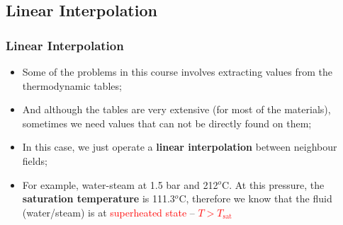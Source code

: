 \documentclass[10pt,compress,handout,ignorenonframetext]{beamer}
\begin{document}
\subsection{Linear Interpolation}
\begin{frame}
  \frametitle{Linear Interpolation}
\noindent
\begin{itemize}
\item <2-> Some of the problems in this course involves extracting values from the thermodynamic tables;
\item <3-> And although the tables are very extensive (for most of the materials), sometimes we need values that can not be directly found on them;
\item <4-> In this case, we just operate a {\bf linear interpolation} between neighbour fields;
\item <5-> For example, water-steam at 1.5 bar and 212$^{o}$C. At this pressure, the {\bf saturation temperature} is 111.3$^{o}$C, therefore we know that the fluid (water/steam) is at \textcolor{red}{superheated state} -- \textcolor{red}{$T > T_{\text{sat}}$}
\end{itemize}

\end{frame}

\end{document}
